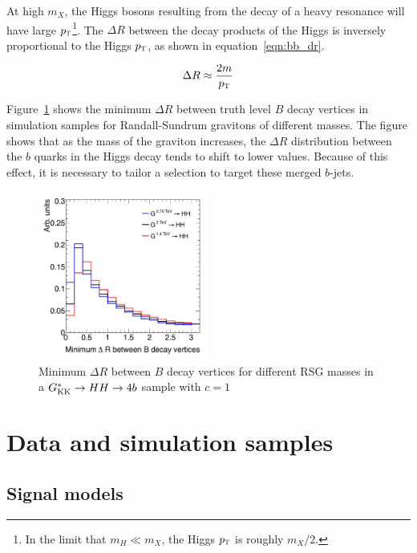 At high $m_{X}$, the Higgs bosons resulting from the decay of a heavy resonance will have large $p_{\textrm{\footnotesize\sc t}}$\footnote{In the limit that $m_{H} \ll m_{X}$, the Higgs $p_{\textrm{\footnotesize\sc t}}$ is roughly $m_{X}/2$.}. The $\Delta R$ between the decay products of the Higgs is inversely proportional to the Higgs $p_{\textrm{\footnotesize\sc t}}$, as shown in equation~\ref{eqn:bb_dr}. 

\begin{equation}
\Delta R \approx \frac{2m}{p_{\textrm{\footnotesize\sc t}}}
\end{equation}

Figure~\ref{fig:bb_dr} shows the minimum $\Delta R$ between truth level $B$ decay vertices in simulation samples for Randall-Sundrum gravitons of different masses. The figure shows that as the mass of the graviton increases, the $\Delta R$ distribution between the $b$ quarks in the Higgs decay tends to shift to lower values. Because of this effect, it is necessary to tailor a selection to target these merged $b$-jets. 

\begin{figure}[h!]
  \centering
  \captionsetup{justification=centering}

  \includegraphics[width=0.5\textwidth]{figures/min_dR_bb}
  \caption{Minimum $\Delta R$ between $B$ decay vertices for different RSG masses in a $G^*_{\rm KK} \to HH \to 4b$ sample with $c = 1$}
  \label{fig:bb_dr}
\end{figure}

\section{Data and simulation samples}

\subsection{Signal models}

